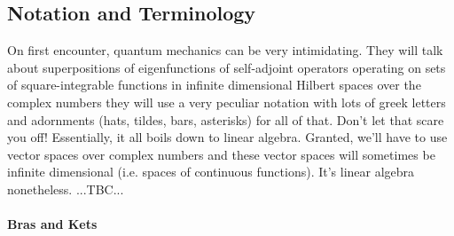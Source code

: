 
\subsection{Notation and Terminology}
On first encounter, quantum mechanics can be very intimidating. They will talk about superpositions of eigenfunctions of self-adjoint operators operating on sets of square-integrable functions in infinite dimensional Hilbert spaces over the complex numbers they will use a very peculiar notation with lots of greek letters and adornments (hats, tildes, bars, asterisks) for all of that. Don't let that scare you off! Essentially, it all boils down to linear algebra. Granted, we'll have to use vector spaces over complex numbers and these vector spaces will sometimes be infinite dimensional (i.e. spaces of continuous functions). It's linear algebra nonetheless. ...TBC...




\paragraph{Bras and Kets}




